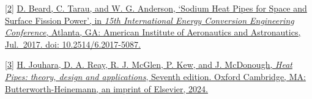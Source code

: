 \documentclass[
]{article}
\begin{document}
\href{https://www.zotero.org/google-docs/?cab6zL}{{[}2{]}}
\href{https://www.zotero.org/google-docs/?cab6zL}{D. Beard, C. Tarau,
and W. G. Anderson, `Sodium Heat Pipes for Space and Surface Fission
Power', in \emph{15th International Energy Conversion Engineering
Conference}, Atlanta, GA: American Institute of Aeronautics and
Astronautics, Jul.~2017. doi: 10.2514/6.2017-5087.}

\href{https://www.zotero.org/google-docs/?cab6zL}{{[}3{]}}
\href{https://www.zotero.org/google-docs/?cab6zL}{H. Jouhara, D. A.
Reay, R. J. McGlen, P. Kew, and J. McDonough, \emph{Heat Pipes: theory,
design and applications}, Seventh edition. Oxford Cambridge, MA:
Butterworth-Heinemann, an imprint of Elsevier, 2024.}
\end{document}
